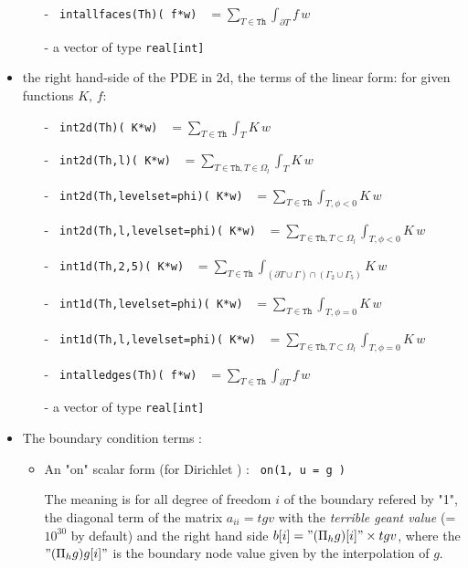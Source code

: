 \documentclass[a4paper,twoside,12pt]{book}
\def\p{\partial}
\begin{document}
\begin{itemize}
\begin{itemize}
       \item[-] \texttt{ intallfaces(Th)( f*w) } $ \displaystyle = \sum_{T\in\mathtt{Th}}\int_{\p T } f\,w  $
       \item[-] a vector of type  \texttt{real[int]}
      \end{itemize}
   \item  the right hand-side of the PDE in 2d, the   terms of the linear form: for given functions $K,\, f$:
         \begin{itemize}
       \item[-]
         \texttt{ int2d(Th)( K*w) } $ \displaystyle = \sum_{T\in\mathtt{Th}}\int_{T
          } K\,w  $
       \item[-]
         \texttt{ int2d(Th,l)( K*w) } $ \displaystyle = \sum_{T\in\mathtt{Th},T\in\Omega_l}\int_{T
          } K\,w  $
       \item[-]  \texttt{ int2d(Th,levelset=phi)( K*w) } $ \displaystyle = \sum_{T\in\mathtt{Th}}\int_{T,\phi<0} K\,w  $ 
       \item[-]  \texttt{ int2d(Th,l,levelset=phi)( K*w) } $ \displaystyle = \sum_{T\in\mathtt{Th},T\subset \Omega_{l}}\int_{T,\phi<0} K\,w  $ 
          
      \item[-] \texttt{ int1d(Th,2,5)( K*w) }   $ \displaystyle = \sum_{T\in\mathtt{Th}}\int_{(\p T\cup\Gamma) \cap ( \Gamma_2 \cup \Gamma_{5}) } K \,w  $
      \item[-]  \texttt{ int1d(Th,levelset=phi)( K*w) } $ \displaystyle = \sum_{T\in\mathtt{Th}}\int_{T,\phi=0} K\,w  $ 
       \item[-]  \texttt{ int1d(Th,l,levelset=phi)( K*w) } $ \displaystyle = \sum_{T\in\mathtt{Th},T\subset \Omega_{l}}\int_{T,\phi=0} K\,w  $ 
       \item[-] \texttt{ intalledges(Th)( f*w) } $ \displaystyle = \sum_{T\in\mathtt{Th}}\int_{\p T } f\,w  $
       \item[-] a vector of type  \texttt{real[int]}
      \end{itemize}

    
    

    \item  The boundary condition terms :
    \begin{itemize}
        \item  An "on" scalar form (for Dirichlet ) :
         \texttt{ on(1, u = g )}

        The meaning is \label{imple-tgv}
        for all degree of freedom $i$ of the boundary refered by "1",  the diagonal
        term  of the matrix $a_{ii}= tgv$  with the   {\em terrible geant value}  (=$10^{30}$ by default)
          and   the right hand side $b[i] = "(\Pi_h g)[i]" \times tgv $,
                where the $"(\Pi_h g)g[i]"$ is the boundary node value given by  the interpolation of $g$.
             

\end{itemize}
\end{itemize}
\end{document}

